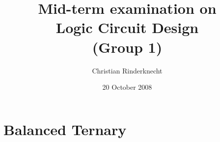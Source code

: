 \documentclass[11pt,a4paper]{article}
\title{Mid-term examination on\\ Logic Circuit Design\\ (Group 1)}
\author{Christian Rinderknecht}
\date{20 October 2008}
\begin{document}
\maketitle
\thispagestyle{empty}

\allowdisplaybreaks

\section{Balanced Ternary}





\end{document}
